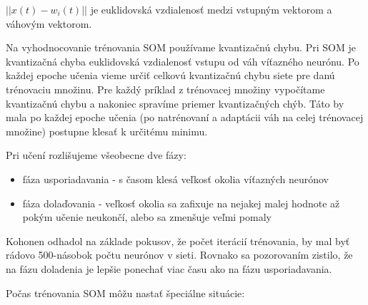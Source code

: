 $||x(t) - w_i(t)||$ je euklidovská vzdialenosť medzi vstupným vektorom a váhovým vektorom.

Na vyhodnocovanie trénovania SOM používame kvantizačnú chybu. 
Pri SOM je kvantizačná chyba euklidovská vzdialenosť vstupu
od váh víťazného neurónu. 
Po každej epoche učenia vieme určiť celkovú kvantizačnú chybu siete pre danú trénovaciu množinu.
Pre každý príklad z trénovacej množiny vypočítame kvantizačnú chybu a nakoniec spravíme priemer kvantizačných chýb. %
 Táto by mala po každej epoche učenia (po natrénovaní a adaptácii váh na celej trénovacej množine) postupne klesať k určitému minimu.

Pri učení rozlišujeme všeobecne dve fázy:
\begin{itemize}
	\item fáza usporiadavania - s časom klesá veľkosť okolia víťazných neurónov 
	\item fáza dolaďovania - veľkosť okolia sa zafixuje na nejakej malej hodnote až pokým učenie neukončí, alebo sa zmenšuje veľmi pomaly
\end{itemize}

Kohonen odhadol na základe pokusov, že počet iterácií trénovania, by mal byť rádovo 500-násobok počtu neurónov v sieti.
Rovnako sa pozorovaním zistilo, že na fázu doladenia je lepšie ponechať viac času ako na fázu usporiadavania.

Počas trénovania SOM môžu nastať špeciálne situácie:

